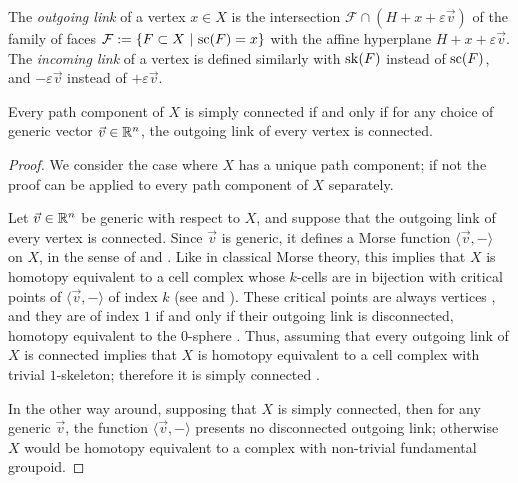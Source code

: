 \begin{definition}
    The \emph{outgoing link} of a vertex $x \in X$ is the intersection $\mathcal{F} \cap (H+x+\varepsilon \vec v)$ of the family of faces $\mathcal{F}:=\{ F \subset X \ | \ \mathrm{sc}(F)=x \}$ with the affine hyperplane $H+x+\varepsilon \vec v$.
    The \emph{incoming link} of a vertex is defined similarly with $\mathrm{sk}(F)$ instead of $\mathrm{sc}(F)$, and $-\varepsilon \vec v$ instead of $+ \varepsilon \vec v$. 
\end{definition}

\begin{lemma}
    \label{lemma:outgoing-link}
    Every path component of $X$ is simply connected if and only if for any choice of generic vector $\vec v \in \mathbb R^n$, the outgoing link of every vertex is connected. 
\end{lemma}

\begin{proof}
    We consider the case where $X$ has a unique path component; if not the proof can be applied to every path component of $X$ separately. 

    Let $\vec v \in \mathbb R^n$ be generic with respect to $X$, and suppose that the outgoing link of every vertex is connected. 
    Since $\vec v$ is generic, it defines a Morse function $\langle \vec v , -\rangle$ on $X$, in the sense of \cite[Definition 2.2]{bestvinaMorseTheoryFiniteness1997} and \cite[Definition 4.1]{grunertPLMorseTheory2019}.
    Like in classical Morse theory, this implies that $X$ is homotopy equivalent to a cell complex whose $k$-cells are in bijection with critical points of $\langle \vec v , -\rangle$ of index $k$ (see \cite[Lemma 2.5]{bestvinaMorseTheoryFiniteness1997} and \cite[Lemma 4.7]{grunertPLMorseTheory2019}).
    These critical points are always vertices \cite[Lemma 2.3]{bestvinaMorseTheoryFiniteness1997}, and they are of index $1$ if and only if their outgoing link is disconnected, homotopy equivalent to the $0$-sphere \cite[Lemma 4.5]{grunertPLMorseTheory2019}.
    Thus, assuming that every outgoing link of $X$ is connected implies that $X$ is homotopy equivalent to a cell complex with trivial $1$-skeleton; therefore it is simply connected \cite[Point (3) of Corollary 2.6]{bestvinaMorseTheoryFiniteness1997}.
    
    In the other way around, supposing that $X$ is simply connected, then for any generic $\vec v$, the function $\langle \vec v , -\rangle$ presents no disconnected outgoing link; otherwise $X$ would be homotopy equivalent to a complex with non-trivial fundamental groupoid. 
\end{proof}

